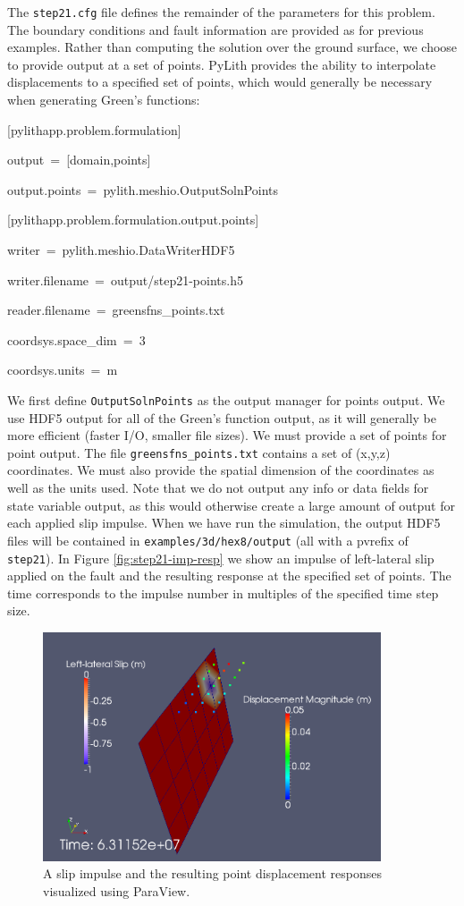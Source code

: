 The \texttt{step21.cfg} file defines the remainder of the parameters
for this problem. The boundary conditions and fault information are
provided as for previous examples. Rather than computing the solution
over the ground surface, we choose to provide output at a set of points.
PyLith provides the ability to interpolate displacements to a specified
set of points, which would generally be necessary when generating
Green's functions:
\begin{lyxcode}
{[}pylithapp.problem.formulation{]}

output~=~{[}domain,points{]}

output.points~=~pylith.meshio.OutputSolnPoints



{[}pylithapp.problem.formulation.output.points{]}

writer~=~pylith.meshio.DataWriterHDF5

writer.filename~=~output/step21-points.h5

reader.filename~=~greensfns\_points.txt

coordsys.space\_dim~=~3

coordsys.units~=~m
\end{lyxcode}
We first define \texttt{OutputSolnPoints} as the output manager for
points output. We use HDF5 output for all of the Green's function
output, as it will generally be more efficient (faster I/O, smaller
file sizes). We must provide a set of points for point output. The
file \texttt{greensfns\_points.txt} contains a set of (x,y,z) coordinates.
We must also provide the spatial dimension of the coordinates as well
as the units used. Note that we do not output any info or data fields
for state variable output, as this would otherwise create a large
amount of output for each applied slip impulse. When we have run the
simulation, the output HDF5 files will be contained in \texttt{examples/3d/hex8/output}
(all with a pvrefix of \texttt{step21}). In Figure \vref{fig:step21-imp-resp}
we show an impulse of left-lateral slip applied on the fault and the
resulting response at the specified set of points. The time corresponds
to the impulse number in multiples of the specified time step size.

\begin{figure}
\begin{centering}
\includegraphics[width=10cm]{tutorials/3dhex8/figs/step21_impulse_resp}
\par\end{centering}

\caption{A slip impulse and the resulting point displacement responses visualized
using ParaView. \label{fig:step21-imp-resp}}
\end{figure}

